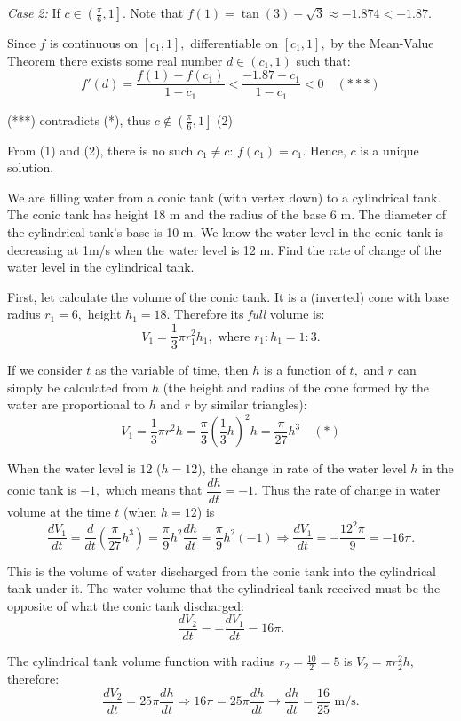 \documentclass{article}
\begin{document}
\begin{soln}
    \textit{Case 2:} If $c \in \left(\frac{\pi}{6}, 1 \right].$ 
    Note that $f(1) = \tan(3) - \sqrt{3} \approx -1.874 < -1.87.$

    Since $f$ is continuous on $[c_1, 1],$ differentiable on $[c_1, 1],$ by the Mean-Value Theorem there exists some real number $d \in (c_1, 1)$ such that:
    \[
        f'(d) = \frac{f(1) - f(c_1)}{1 - c_1} < \frac{-1.87 - c_1}{1-c_1} < 0 \quad (***)
    \]

    (***) contradicts (*), thus $c \not \in \left(\frac{\pi}{6}, 1 \right]$ \quad (2)
    
    From (1) and (2), there is no such $c_1 \ne c$: $f(c_1) = c_1.$
    Hence, $c$ is a unique solution.
\end{soln}

\newpage

\begin{problem*}[4]
    We are filling water from a conic tank (with vertex down) to a cylindrical tank.
    The conic tank has height 18 m and the radius of the base 6 m. The diameter of the cylindrical tank’s base is 10 m.
    We know the water level in the conic tank is decreasing at 1m/s when the water level is 12 m.
    Find the rate of change of the water level in the cylindrical tank.
\end{problem*}

\begin{soln}
    First, let calculate the volume of the conic tank. It is a (inverted) cone with base radius $r_1 = 6,$ height $h_1 = 18.$
    Therefore its \textit{full} volume is:
    \[
        V_1 = \frac{1}{3} \pi r_1^2 h_1,\text{\ where\ } r_1 : h_1 = 1 : 3.
    \] 

    If we consider $t$ as the variable of time, then $h$ is a function of $t,$ and $r$ can simply be calculated from $h$
    (the height and radius of the cone formed by the water are proportional to $h$ and $r$ by similar triangles):
    \[
        V_1 = \frac{1}{3} \pi r^2 h = \frac{\pi}{3} \left(\frac{1}{3} h \right)^2 h =  \frac{\pi}{27} h^3 \quad (*)
    \]

    When the water level is $12$ ($h = 12$), the change in rate of the water level $h$ in the conic tank is $-1,$ which means that $\dfrac{dh}{dt} = -1.$
    Thus the rate of change in water volume at the time $t$ (when $h=12$) is
    \[
        \frac{dV_1}{dt} = \frac{d}{dt} \left( \frac{\pi}{27} h^3 \right) = \frac{\pi}{9} h^2 \dfrac{dh}{dt} = \frac{\pi}{9} h^2 (-1)
        \Rightarrow \frac{dV_1}{dt} = - \frac{12^2 \pi}{9} = - 16\pi.
    \]

    This is the volume of water discharged from the conic tank into the cylindrical tank under it.
    The water volume that the cylindrical tank received must be the opposite of what the conic tank discharged:
    \[
        \frac{dV_2}{dt} = - \frac{dV_1}{dt} = 16\pi.
    \]

    The cylindrical tank volume function with radius $r_2 = \frac{10}{2}  = 5$ is $V_2 = \pi r_2^2 h,$ therefore:
    \[
        \frac{dV_2}{dt} = 25 \pi \frac{dh}{dt} \Rightarrow 16\pi = 25 \pi \frac{dh}{dt}  \rightarrow \frac{dh}{dt}  = \boxed{\frac{16}{25}} \text{\ m/s.}
    \]
\end{soln}
\end{document}
